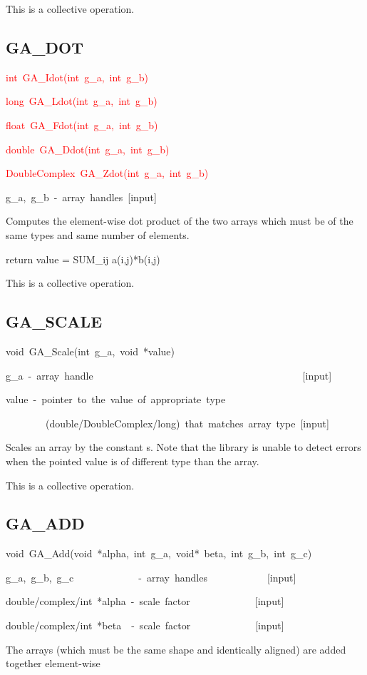 This is a collective operation. 


\subsection*{\label{sub:GA_DOT}GA\_DOT}
\begin{lyxcode}
\textcolor{red}{int~GA\_Idot(int~g\_a,~int~g\_b)~}

\textcolor{red}{long~GA\_Ldot(int~g\_a,~int~g\_b)~}

\textcolor{red}{float~GA\_Fdot(int~g\_a,~int~g\_b)~}

\textcolor{red}{double~GA\_Ddot(int~g\_a,~int~g\_b)~}

\textcolor{red}{DoubleComplex~GA\_Zdot(int~g\_a,~int~g\_b)}



g\_a,~g\_b~-~array~handles~{[}input{]}
\end{lyxcode}
Computes the element-wise dot product of the two arrays which must
be of the same types and same number of elements.

return value = SUM\_ij a(i,j){*}b(i,j)

This is a collective operation. 


\subsection*{\label{sub:GA_SCALE}GA\_SCALE}
\begin{lyxcode}
void~GA\_Scale(int~g\_a,~void~{*}value)



g\_a~-~array~handle~~~~~~~~~~~~~~~~~~~~~~~~~~~~~~~~~~~~~~~~~~{[}input{]}~

value~-~pointer~to~the~value~of~appropriate~type~

~~~~~~~~(double/DoubleComplex/long)~that~matches~array~type~{[}input{]}
\end{lyxcode}
Scales an array by the constant s. Note that the library is unable
to detect errors when the pointed value is of different type than
the array.

This is a collective operation. 


\subsection*{\label{sub:GA_ADD}GA\_ADD}
\begin{lyxcode}
void~GA\_Add(void~{*}alpha,~int~g\_a,~void{*}~beta,~int~g\_b,~int~g\_c)



g\_a,~g\_b,~g\_c~~~~~~~~~~~~~-~array~handles~~~~~~~~~~~~{[}input{]}~

double/complex/int~{*}alpha~-~scale~factor~~~~~~~~~~~~~{[}input{]}

double/complex/int~{*}beta~~-~scale~factor~~~~~~~~~~~~~{[}input{]}
\end{lyxcode}
The arrays (which must be the same shape and identically aligned)
are added together element-wise

